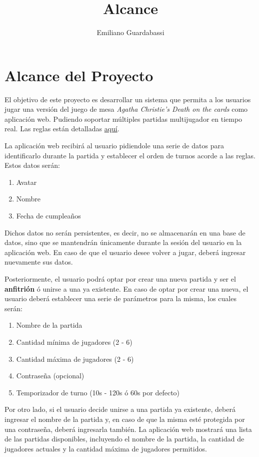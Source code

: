 \documentclass[12pt,a4paper]{article}
\title{\textbf{Alcance}}
\author{Emiliano Guardabassi}
\date{} %
\begin{document}
\maketitle

\section*{Alcance del Proyecto}
El objetivo de este proyecto es desarrollar un sistema que permita a los usuarios jugar una versión del juego de mesa
\textit{Agatha Christie's Death on the cards} como aplicación web. Pudiendo soportar múltiples partidas multijugador en tiempo real.
Las reglas están detalladas \href{https://drive.google.com/file/d/1FV6UZLrJWPkj3h-fCvlWORsK6dP490Zc/view}{aquí}.

La aplicación web recibirá al usuario pidiendole una serie de datos para
identificarlo durante la partida y establecer el orden de turnos acorde a
las reglas. Estos datos serán:
\begin{enumerate}
    \item Avatar
    \item Nombre
    \item Fecha de cumpleaños
\end{enumerate}
Dichos datos no serán persistentes, es decir, no se almacenarán en una base de
datos, sino que se mantendrán únicamente durante la sesión del usuario en la
aplicación web. En caso de que el usuario desee volver a jugar, deberá ingresar
nuevamente sus datos.

Posteriormente, el usuario podrá optar por crear una nueva partida y ser el 
\textbf{anfitrión} ó unirse a una ya existente. En caso de optar por crear 
una nueva, el usuario deberá establecer una serie de parámetros para la misma, 
los cuales serán:
\begin{enumerate}
    \item Nombre de la partida
    \item Cantidad mínima de jugadores (2 - 6)
    \item Cantidad máxima de jugadores (2 - 6)
    \item Contraseña (opcional)
    \item Temporizador de turno (10s - 120s ó 60s por defecto)
\end{enumerate}
Por otro lado, si el usuario decide unirse a una partida ya existente, deberá
ingresar el nombre de la partida y, en caso de que la misma esté protegida por
una contraseña, deberá ingresarla también. La aplicación web mostrará una lista
de las partidas disponibles, incluyendo el nombre de la partida, la cantidad
de jugadores actuales y la cantidad máxima de jugadores permitidos.
\end{document}
